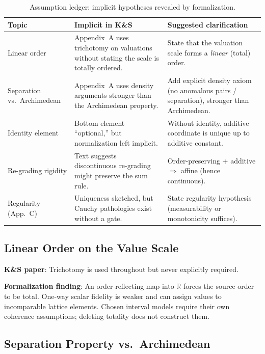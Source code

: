 \documentclass[11pt]{article}
\begin{document}
\begin{table}[ht]
\centering
\small
\renewcommand{\arraystretch}{1.4}
\begin{tabular}{@{} p{2.8cm} p{5.5cm} p{5.5cm} @{}}
\toprule
\textbf{Topic} & \textbf{Implicit in K\&S} & \textbf{Suggested clarification} \\
\midrule
Linear order &
Appendix~A uses trichotomy on valuations without stating the scale is totally ordered. &
State that the valuation scale forms a \emph{linear} (total) order. \\[4pt]

Separation vs.\ Archimedean &
Appendix~A uses density arguments stronger than the Archimedean property. &
Add explicit density axiom (no anomalous pairs / separation), stronger than Archimedean. \\[4pt]

Identity element &
Bottom element ``optional,'' but normalization left implicit. &
Without identity, additive coordinate is unique up to additive constant. \\[4pt]

Re-grading rigidity &
Text suggests discontinuous re-grading might preserve the sum rule. &
Order-preserving + additive $\Rightarrow$ affine (hence continuous). \\[4pt]

Regularity (App.~C) &
Uniqueness sketched, but Cauchy pathologies exist without a gate. &
State regularity hypothesis (measurability or monotonicity suffices). \\
\bottomrule
\end{tabular}
\caption{Assumption ledger: implicit hypotheses revealed by formalization.}
\label{tab:assumption-ledger}
\end{table}

\subsection{Linear Order on the Value Scale}

\textbf{K\&S paper}: Trichotomy is used throughout but never explicitly required.

\textbf{Formalization finding}: An order-reflecting map into $\mathbb{R}$ forces
the source order to be total. One-way scalar fidelity is weaker and can assign
values to incomparable lattice elements. Chosen interval models require their
own coherence assumptions; deleting totality does not construct them.

\subsection{Separation Property vs.\ Archimedean}
\end{document}
